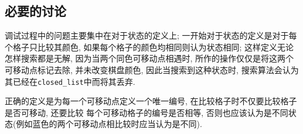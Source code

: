 \subsection{必要的讨论}

调试过程中的问题主要集中在对于状态的定义上; 一开始对于状态的定义是对于每个格子只比较其颜色,
如果每个格子的颜色均相同则认为状态相同; 这样定义无论怎样搜索都是无解, 因为当两个同色可移动点相遇时,
所作的操作仅仅是将这两个可移动点标记去除, 并未改变棋盘颜色, 因此当搜索到这种状态时, 搜索算法会认为
其已经在\verb|closed_list|中而将其丢弃.

正确的定义是为每一个可移动点定义一个唯一编号, 在比较格子时不仅要比较格子是否可移动, 还要比较
每个可移动格子的编号是否相等, 否则也应该认为是不同状态(例如蓝色的两个可移动点相比较时应当认为是不同).
